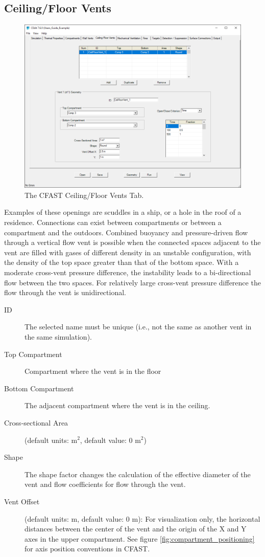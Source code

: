 \subsection{Ceiling/Floor Vents}
\label{info:VENT2}
\begin{figure}[h!]
\includegraphics[width=6.5in]{FIGURES/Vertical_Flow_Tab}
\caption[The CFAST Ceiling/Floor Vents Tab]{The CFAST Ceiling/Floor Vents Tab.}
\end{figure}

Examples of these openings are scuddles in a ship, or a hole in the roof of a residence. Connections can exist between compartments or between a compartment and the outdoors. Combined buoyancy and pressure-driven flow through a vertical flow vent is possible when the connected spaces adjacent to the vent are filled with gases of different density in an unstable configuration, with the density of the top space greater than that of the bottom space. With a moderate cross-vent pressure difference, the instability leads to a bi-directional flow between the two spaces. For relatively large cross-vent pressure difference the flow through the vent is unidirectional.

\begin{description}
\item[ID] The selected name must be unique (i.e., not the same as another vent in the same simulation).
\item[Top Compartment] Compartment where the vent is in the floor
\item[Bottom Compartment] The adjacent compartment where the vent is in the ceiling.
\label{Ceil Cross-sectional Area}
\item[Cross-sectional Area] (default units: m$^2$, default value: 0 m$^2$)
\label{Ceil Shape}
\item[Shape] The shape factor changes the calculation of the effective diameter of the vent and flow coefficients for flow through the vent.
\item[Vent Offset] (default units: m, default value: 0 m): For visualization only, the horizontal distances between the center of the vent and the origin of the X and Y axes in the upper compartment. See figure \ref{fig:compartment_positioning} for axis position conventions in CFAST.
\end{description}

